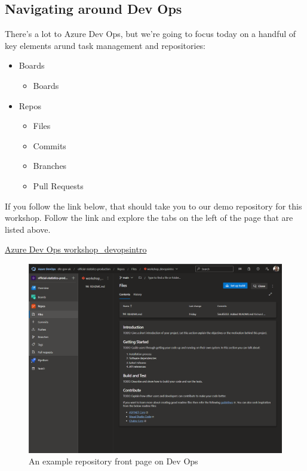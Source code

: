 \documentclass[
  12pt,
]{article}
\providecommand{\tightlist}{%
  \setlength{\itemsep}{0pt}\setlength{\parskip}{0pt}}
\begin{document}
\hypertarget{navigating-around-dev-ops}{%
\subsection{Navigating around Dev Ops}\label{navigating-around-dev-ops}}

There's a lot to Azure Dev Ops, but we're going to focus today on a
handful of key elements arund task management and repositories:

\begin{itemize}
\tightlist
\item
  Boards

  \begin{itemize}
  \tightlist
  \item
    Boards
  \end{itemize}
\item
  Repos

  \begin{itemize}
  \tightlist
  \item
    Files
  \item
    Commits
  \item
    Branches
  \item
    Pull Requests
  \end{itemize}
\end{itemize}

If you follow the link below, that should take you to our demo
repository for this workshop. Follow the link and explore the tabs on
the left of the page that are listed above.

\href{https://dfe-gov-uk.visualstudio.com/official-statistics-production/_git/workshop_devopsintro}{Azure
Dev Ops workshop\_devopsintro}

\begin{figure}
\centering
\includegraphics{images/DevOpsdemo/DevOps_repo_frontpage.PNG}
\caption{An example repository front page on Dev Ops}
\end{figure}
\end{document}
